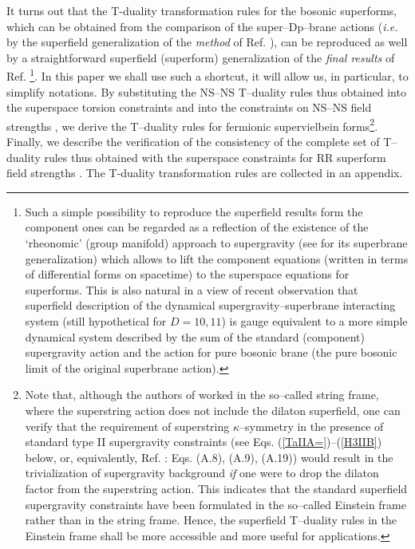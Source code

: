 \documentclass[a4paper,11pt]{article}
\begin{document}
It turns out that the 
T-duality transformation rules for the bosonic superforms, which 
can be obtained from the comparison of  
the super--Dp--brane actions ({\it i.e.} by the 
superfield generalization of the {\sl method} of Ref. \cite{simon}), 
can be reproduced as well by a straightforward 
superfield (superform) generalization of the 
{\sl final results} of 
Ref. \cite{simon}
\footnote{Such a simple possibility to reproduce the 
superfield results form the component ones can be regarded as a reflection 
of the existence of the `rheonomic' 
(group manifold) approach to supergravity \cite{rheo} (see \cite{bsv} for its 
superbrane generalization) which allows to lift the component equations 
(written 
in terms of differential forms on spacetime) to the superspace equations 
for superforms. This is also natural in a view of 
recent observation \cite{BdAIL2} that superfield description of the 
dynamical supergravity--superbrane interacting system (still hypothetical  
for $D=10,11$) is gauge equivalent to a more simple dynamical system 
described by the sum of the standard (component) supergravity action 
and the action for pure bosonic brane 
(the pure bosonic limit of the original superbrane action).}. 
In this paper we shall use such a shortcut, it will allow us, in particular, 
to simplify notations.
By substituting the NS--NS T--duality rules thus obtained 
into the superspace torsion constraints and into the constraints 
on NS--NS field strengths
\cite{HW84,CGO87,c0}, we derive the T--duality rules for fermionic 
supervielbein forms\footnote{Note that, although the authors 
of \cite{kulik} worked in the so--called string frame, 
where the superstring action does not include the dilaton superfield,  
one can verify 
that the requirement of superstring $\kappa$--symmetry in the 
presence of standard type II supergravity constraints \cite{c0} 
(see Eqs. (\ref{TaIIA=})--(\ref{H3IIB}) below, or, equivalently, 
Ref. \cite{kulik}: Eqs. (A.8), (A.9), (A.19)) would result in the 
trivialization of supergravity background {\sl if} one were to drop the 
dilaton factor from the superstring action. 
This indicates that the standard superfield supergravity constraints 
have been formulated in the so--called 
Einstein frame rather than in the string frame.
Hence, the superfield T--duality rules in the Einstein frame shall be more  
accessible and more useful for applications.}. 
Finally, we describe the verification  
of the consistency of the complete set of 
T--duality rules thus obtained with the superspace constraints for RR 
superform field strengths \cite{c0}. The T-duality transformation rules are collected 
in an appendix.
\end{document}
